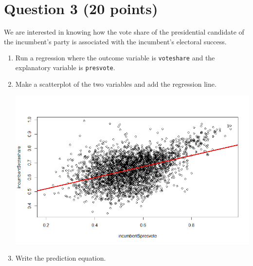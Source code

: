 \documentclass[12pt,letterpaper]{article}
\begin{document}
	\newpage	
\section*{Question 3 (20 points)}

\noindent We are interested in knowing how the vote share of the presidential candidate of the incumbent's party is associated with the incumbent's electoral success.
	\vspace{.25cm}
	\begin{enumerate}
		\item Run a regression where the outcome variable is 		\texttt{voteshare} and the explanatory variable is \texttt{presvote}.
			

	 
			
			
			\vspace{5cm}
		\item Make a scatterplot of the two variables and add the regression line. 
		
		 
		
			\includegraphics[scale=.75]{plot3.png}
		
			\vspace{5cm}
		\item Write the prediction equation.
		
		 
		
	\end{enumerate}
	

\newpage	
\end{document}
